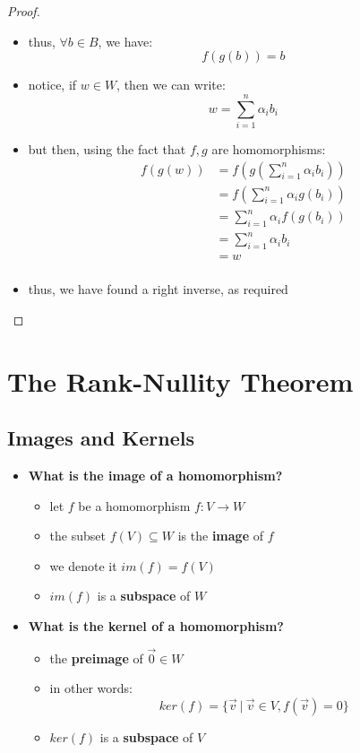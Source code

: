 \documentclass{exam}
\begin{document}
\begin{proof}
\begin{itemize}
\begin{itemize}
        \item thus, $\forall b \in B$, we have:
        \[
        f(g(b)) = b
        \]
        \item notice, if $w \in W$, then we can write:
        \[
        w = \sum_{i = 1}^n \alpha_i b_i
        \]
        \item but then, using the fact that $f,g$ are homomorphisms:
        \begin{align*}
            f(g(w)) &= f\left(g\left(\sum_{i = 1}^n \alpha_i b_i\right)\right) \\
            &= f\left(\sum_{i = 1}^n \alpha_i g(b_i)\right) \\
            &= \sum_{i = 1}^n \alpha_i f(g(b_i)) \\
            &= \sum_{i = 1}^n \alpha_i b_i \\
            &= w \\
        \end{align*}
        \item thus, we have found a right inverse, as required
    \end{itemize}
\end{itemize}

\end{proof}

\section{The Rank-Nullity Theorem}

\subsection{Images and Kernels}

\begin{itemize}
    \item \textbf{What is the image of a homomorphism?}
    \begin{itemize}
        \item let $f$ be a homomorphism $f : V \to W$
        \item the subset $f(V) \subseteq W$ is the \textbf{image} of $f$
        \item we denote it $im(f) = f(V)$
        \item $im(f)$ is a \textbf{subspace} of $W$
    \end{itemize}
    \item \textbf{What is the kernel of a homomorphism?}
    \begin{itemize}
        \item the \textbf{preimage} of $\vec{0} \in W$
        \item in other words:
        \[
        ker(f) = \{\vec{v} \ | \ \vec{v} \in V, f(\vec{v}) = 0\}
        \]
        \item $ker(f)$ is a \textbf{subspace} of $V$
    \end{itemize}
\end{itemize}
\end{document}
